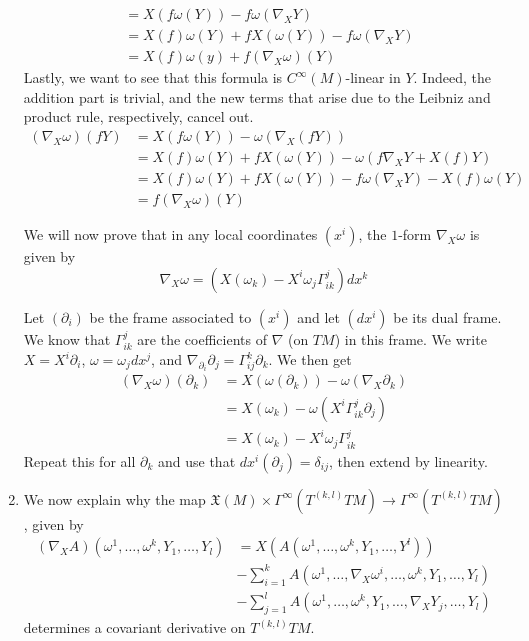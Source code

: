 \documentclass[a4paper, 12pt]{article}
\begin{document}
\begin{Exercise}
\begin{enumerate}[label=(\roman*)]
\begin{align*}
                &= X(f\omega(Y)) - f\omega(\nabla_XY) \\
                &= X(f)\omega(Y) + fX(\omega(Y)) - f\omega(\nabla_XY) \\
                &= X(f)\omega(y) + f(\nabla_X\omega)(Y)
            \end{align*}
            Lastly, we want to see that this formula is $C^\infty(M)$-linear in $Y$.
            Indeed, the addition part is trivial, and the new terms that arise due to the Leibniz and product rule, respectively, cancel out.
            \begin{align*}
                (\nabla_X\omega)(fY)
                &= X(f\omega(Y)) - \omega(\nabla_X(fY)) \\
                &= X(f)\omega(Y) + fX(\omega(Y)) - \omega(f\nabla_XY + X(f)Y) \\
                &= X(f)\omega(Y) + fX(\omega(Y)) - f\omega(\nabla_XY) - X(f)\omega(Y) \\
                &= f(\nabla_X\omega)(Y)
            \end{align*}
            
            We will now prove that in any local coordinates $(x^i)$,
            the $1$-form $\nabla_X\omega$ is given by
            \[
                \nabla_X\omega = (X(\omega_k) - X^i\omega_j\Gamma_{ik}^{j})dx^k
            \]
            
            Let $(\partial_i)$ be the frame associated to $(x^i)$ and let $(dx^i)$ be its dual frame.
            We know that $\Gamma_{ik}^{j}$ are the coefficients of $\nabla$ (on $TM$) in this frame.
            We write $X = X^i\partial_i$, $\omega = \omega_jdx^j$, and $\nabla_{\partial_i}\partial_j = \Gamma_{ij}^{k}\partial_k$.
            We then get
            \begin{align*}
                (\nabla_X\omega)(\partial_k)
                &= X(\omega(\partial_k)) - \omega(\nabla_X\partial_k) \\
                &= X(\omega_k) - \omega(X^i\Gamma_{ik}^{j}\partial_j) \\
                &= X(\omega_k) - X^i\omega_j\Gamma_{ik}^j
            \end{align*}
            Repeat this for all $\partial_k$ and use that $dx^i(\partial_j) = \delta_{ij}$, then extend by linearity.
        \item We now explain why the map $\mathfrak{X}(M)\times\Gamma^\infty(T^{(k,l)}TM) \to \Gamma^\infty(T^{(k,l)}TM)$,
            given by
            \begin{align*}
                (\nabla_XA)(\omega^1,\dots,\omega^k,Y_1,\dots,Y_l)
                &= X(A(\omega^1,\dots,\omega^k,Y_1,\dots,Y^l)) \\
                &- \sum_{i = 1}^{k}A(\omega^1,\dots,\nabla_X\omega^i,\dots,\omega^k,Y_1,\dots,Y_l) \\
                &- \sum_{j = 1}^{l} A(\omega^1,\dots,\omega^k,Y_1,\dots,\nabla_XY_j,\dots,Y_l)
            \end{align*}
            determines a covariant derivative on $T^{(k,l)}TM$.


\end{enumerate}
\end{Exercise}
\end{document}

